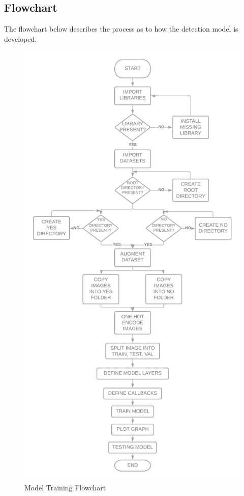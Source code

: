 \subsection{Flowchart}
The flowchart below describes the process as to how the detection model is developed.
\begin{figure}[H]
\includegraphics[scale=0.18]{Photos/model_flowchart.png}
\caption{Model Training Flowchart} \label{fig:model_flowchart}
\end{figure}
